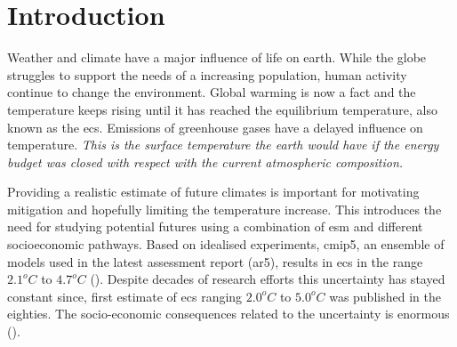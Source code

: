 \chapter{Introduction} \label{ch:introduction}
Weather and climate have a major influence of life on earth. While the globe struggles to support the needs of a increasing population, human activity continue to change the environment. Global warming is now a fact and the temperature keeps rising until it has reached the equilibrium temperature, also known as the \acrfull{ecs}. Emissions of greenhouse gases have a delayed influence on temperature. \textit{This is the surface temperature the earth would have if the energy budget was closed with respect with the current atmospheric composition.}

Providing a realistic estimate of future climates is important for motivating mitigation and hopefully limiting the temperature increase. This introduces the need for studying potential futures using a combination of \acrfull{esm} and different socioeconomic pathways. Based on idealised experiments, \acrfull{cmip5}, an ensemble of models used in the latest assessment report (\acrshort{ar5}), results in \acrshort{ecs} in the range $2.1^oC$ to $4.7^oC$ (\cite{IPCC_CH9_climate_models}). Despite decades of research efforts this uncertainty has stayed constant since, \cite{hansen} first estimate of \acrshort{ecs} ranging $2.0^oC$ to $5.0^oC$ was published in the eighties. The socio-economic consequences related to the uncertainty is enormous (\cite{bony2015}). 





